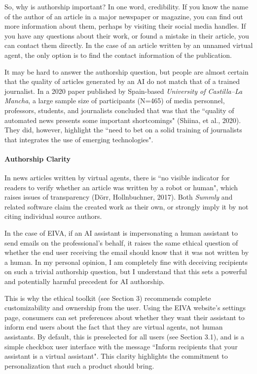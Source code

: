 \documentclass{article}
\begin{document}
So, why is authorship important? In one word, credibility. If you know the name of the author of an article in a major newspaper or magazine, you can find out more information about them, perhaps by visiting their social media handles. If you have any questions about their work, or found a mistake in their article, you can contact them directly. In the case of an article written by an unnamed virtual agent, the only option is to find the contact information of the publication.

It may be hard to answer the authorship question, but people are almost certain that the quality of articles generated by an AI do not match that of a trained journalist. In a 2020 paper published by Spain-based \emph{University of Castilla–La Mancha}, a large sample size of participants (N=465) of media personnel, professors, students, and journalists concluded that was that the ``quality of automated news presents some important shortcomings" (Shiina, et al., 2020). They did, however, highlight the ``need to bet on a solid training of journalists that integrates the use of emerging technologies".

\paragraph{Authorship Clarity}

In news articles written by virtual agents, there is ``no visible indicator for readers to verify whether an article was written by a robot or human", which raises issues of transparency (Dörr, Hollnbuchner, 2017). Both \emph{Summly} and related software claim the created work as their own, or strongly imply it by not citing individual source authors.

In the case of EIVA, if an AI assistant is impersonating a human assistant to send emails on the professional's behalf, it raises the same ethical question of whether the end user receiving the email should know that it was not written by a human. In my personal opinion, I am completely fine with deceiving recipients on such a trivial authorship question, but I understand that this sets a powerful and potentially harmful precedent for AI authorship.

This is why the ethical toolkit (see Section 3) recommends complete customizability and ownership from the user. Using the EIVA website's settings page, consumers can set preferences about whether they want their assistant to inform end users about the fact that they are virtual agents, not human assistants. By default, this is preselected for all users (see Section 3.1), and is a simple checkbox user interface with the message ``Inform recipients that your assistant is a virtual assistant". This clarity highlights the commitment to personalization that such a product should bring.
\end{document}
